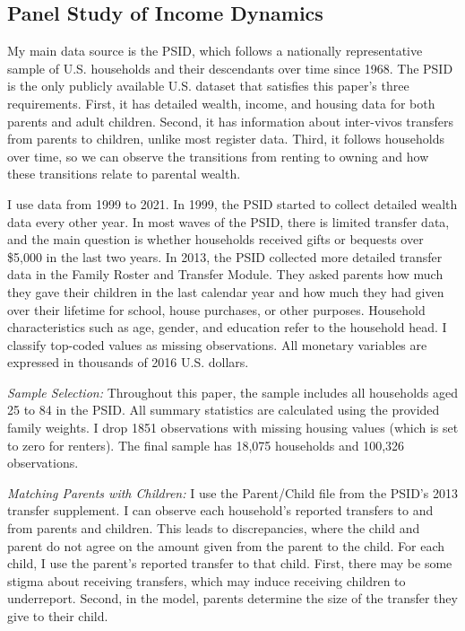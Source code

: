\documentclass[12pt]{article}
\begin{document}
\subsection{Panel Study of Income Dynamics}\label{sec:PSID}
My main data source is the PSID, which follows a nationally representative sample of U.S. households and their descendants over time since 1968. The PSID is the only publicly available U.S. dataset that satisfies this paper's three requirements. First, it has detailed wealth, income, and housing data for both parents and adult children. Second, it has information about inter-vivos transfers from parents to children, unlike most register data. Third, it follows households over time, so we can observe the transitions from renting to owning and how these transitions relate to parental wealth.

I use data from 1999 to 2021. In 1999, the PSID started to collect detailed wealth data every other year. In most waves of the PSID, there is limited transfer data, and the main question is whether households received gifts or bequests over \$5,000 in the last two years. In 2013, the PSID collected more detailed transfer data in the Family Roster and Transfer Module. They asked parents how much they gave their children in the last calendar year and how much they had given over their lifetime for school, house purchases, or other purposes. Household characteristics such as age, gender, and education refer to the household head. I classify top-coded values as missing observations. All monetary variables are expressed in thousands of 2016 U.S. dollars.

\textit{Sample Selection:} Throughout this paper, the sample includes all households aged 25 to 84 in the PSID. All summary statistics are calculated using the provided family weights. I drop 1851 observations with missing housing values (which is set to zero for renters). The final sample has 18,075 households and 100,326 observations.

\textit{Matching Parents with Children:} I use the Parent/Child file from the PSID's 2013 transfer supplement. I can observe each household's reported transfers to and from parents and children. This leads to discrepancies, where the child and parent do not agree on the amount given from the parent to the child. For each child, I use the parent's reported transfer to that child. First, there may be some stigma about receiving transfers, which may induce receiving children to underreport. Second, in the model, parents determine the size of the transfer they give to their child. 
\end{document}
